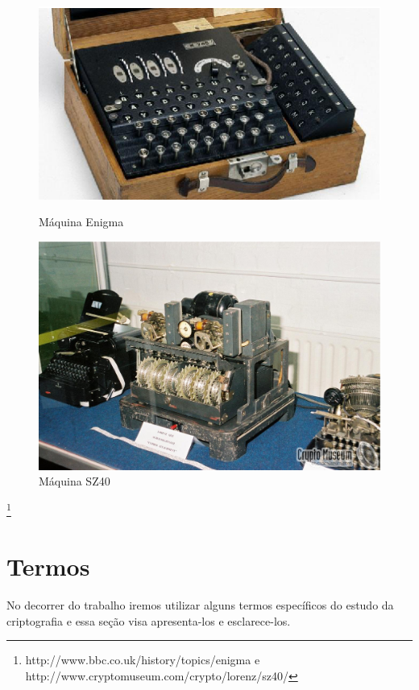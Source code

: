 \begin{figure}[h]
\centering
\begin{minipage}{.5\textwidth}
  \centering
  \includegraphics[keepaspectratio=true,scale=1]
  {figuras/enigma.eps}
  \caption{Máquina Enigma}
  \label{enigma-machine}
\end{minipage}%
\begin{minipage}{.5\textwidth}
  \centering
  \includegraphics[keepaspectratio=true,scale=0.1]
  {figuras/sz40.eps}
  \caption{Máquina SZ40}
    \label{sz40-machine}
\end{minipage}
\end{figure}\footnote{ http://www.bbc.co.uk/history/topics/enigma e http://www.cryptomuseum.com/crypto/lorenz/sz40/}

%
\section{Termos}
\label{terms}

No decorrer do trabalho iremos utilizar alguns termos específicos do estudo da criptografia e essa seção visa apresenta-los e esclarece-los.

